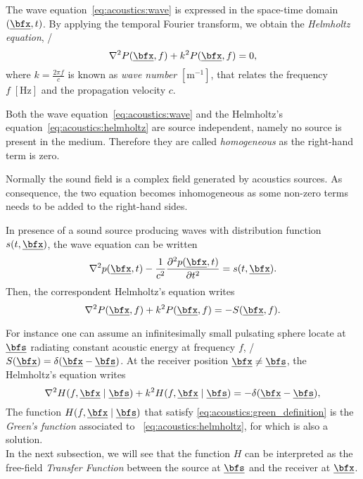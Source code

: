 The wave equation~\ref{eq:acoustics:wave} is expressed in the space-time domain $\depSpaceTime$.
By applying the temporal Fourier transform, we obtain the \textit{Helmholtz equation}, \ie/
\begin{equation}
    \label{eq:acoustics:helmholtz}
    \knabla^2 P(\positionMicrophone, f) + k^2 P(\positionMicrophone, f) = 0
    ,
\end{equation}
where $k = \frac{2 \pi f}{c}$  is known as \textit{wave number} $[\si{\metre^{-1}}]$, that relates the frequency $f \; [\si{\hertz}]$ and the propagation velocity $c$.

Both the wave equation~\ref{eq:acoustics:wave} and the Helmholtz's equation~\ref{eq:acoustics:helmholtz} are source independent,
namely no source is present in the medium.
Therefore they are called \textit{homogeneous} as the right-hand term is zero.

Normally the sound field is a complex field generated by acoustics sources.
As consequence, the two equation becomes inhomogeneous as some non-zero terms needs to be added to the right-hand sides.

In presence of a sound source producing waves with distribution function $s(t, \positionMicrophone)$, the wave equation can be written
\begin{equation}
    \label{eq:acoustics:source}
    \knabla^2 \pressureSpaceTime - \frac{1}{\speedOfSound^2} \kpderiv[2]{\pressureSpaceTime}{t} = s(t, \positionMicrophone)
    .
\end{equation}
Then, the correspondent Helmholtz's equation writes
\begin{equation}
    \label{eq:acoustics:source_freq}
    \knabla^2 P(\positionMicrophone, f) + k^2 P(\positionMicrophone, f) = - S(\positionMicrophone, f)
    .
\end{equation}

For instance one can assume an infinitesimally small pulsating sphere locate at $\positionSource$ radiating constant acoustic energy at frequency $f$,
\ie/ $S(\positionMicrophone) = \delta(\positionMicrophone - \positionSource)$.
At the receiver position $\positionMicrophone \neq \positionSource$, the Helmholtz's equation writes
\begin{equation}
    \label{eq:acoustics:green_definition}
    \knabla^2 H(f, \positionMicrophone \mid \positionSource)
     + k^2 H(f, \positionMicrophone \mid \positionSource) = - \delta(\positionMicrophone - \positionSource)
    ,
\end{equation}
The function $H(f, \positionMicrophone \mid \positionSource)$ that satisfy \cref{eq:acoustics:green_definition} is the \textit{Green's function}
associated to ~\cref{eq:acoustics:helmholtz}, for which is also a solution.
\\In the next subsection, we will see that the function $H$ can be interpreted as the free-field \textit{Transfer Function}
between the source at $\positionSource$ and the receiver at $\positionMicrophone$.

